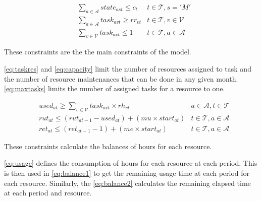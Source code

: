 \documentclass{roadef}
\begin{document}
    \begin{align}
        & \sum_{a \in \mathcal{A}} state_{ast} \leq c_{t}
                & t \in \mathcal{T}, s = 'M' \label{eq:capacity}\\
        & \sum_{a \in \mathcal{A}} task_{avt} \geq rr_{vt}
                & t \in \mathcal{T}, v \in \mathcal{V} \label{eq:taskres}\\
        & \sum_{v \in \mathcal{V}} task_{avt} \leq 1
                & t \in \mathcal{T}, a \in \mathcal{A} \label{eq:maxtasks}
    \end{align}

    These constraints are the the main constraints of the model.

    \ref{eq:taskres} and \ref{eq:capacity} limit the number of resources assigned to task and the number of resource maintenances that can be done in any given month.
    \ref{eq:maxtasks} limits the number of assigned tasks for a resource to one.
        
    \begin{align}
        & used_{at} \geq \sum_{v \in \mathcal{V}} task_{avt} \times rh_{vt}
                & a \in \mathcal{A}, t \in \mathcal{T} \label{eq:usage}\\
        & rut_{at} \leq (rut_{at-1} - used_{at}) + (mu \times start_{at})
                & t \in \mathcal{T}, a \in \mathcal{A} \label{eq:balance1}\\
        & ret_{at} \leq (ret_{at-1} - 1) + (me \times start_{at})
                & t \in \mathcal{T}, a \in \mathcal{A} \label{eq:balance2}
    \end{align}
    
    These constraints calculate the balances of hours for each resource.

    \ref{eq:usage} defines the consumption of hours for each resource at each period. This is then used in \ref{eq:balance1} to get the remaining usage time at each period for each resource. Similarly, the \ref{eq:balance2} calculates the remaining elapsed time at each period and resource.        
\end{document}
